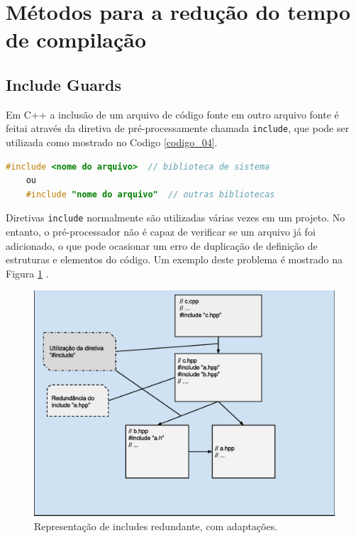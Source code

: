 \section{Métodos para a redução do tempo de compilação}

\subsection{Include Guards}\label{include_guards_section}

Em C++ a inclusão de um arquivo de código fonte em outro arquivo fonte é feitai
 através da diretiva de pré-processamente chamada \texttt{include}, que pode 
ser utilizada como mostrado no Codigo \ref{codigo_04}. 

\begin{lstlisting}[language=C++,frame=single,title={Código 4: Diretiva de 
                           pré-processamento para inclusão de um arquivo},
                                                   label=codigo_04]
    #include <nome do arquivo>  // biblioteca de sistema 
    ou
    #include "nome do arquivo"  // outras bibliotecas 


\end{lstlisting}


Diretivas \texttt{include} normalmente são utilizadas várias vezes em um projeto.
 No entanto, o pré-processador não é capaz de verificar se um arquivo já foi
 adicionado, o que pode ocasionar um erro de duplicação de definição de
 estruturas e elementos do código. Um exemplo deste problema é mostrado na
 Figura \ref{fig07} \cite{ref41}.


\begin{figure}[h]
    \centering
    \label{fig07}
        \includegraphics[keepaspectratio=true,scale=0.5]{figuras/multi_include.eps}
    \caption{ Representação de includes redundante, com adaptações\cite{ref42}.}
\end{figure}



